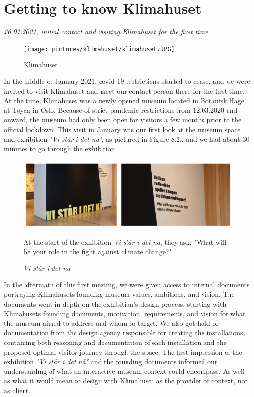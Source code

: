 \section{Getting to know Klimahuset}
\par
\emph{26.01.2021, initial contact and visiting Klimahuset for the first time}
\par

\begin{figure}[H]
\centering
\texttt{[image: pictures/klimahuset/klimahuset.JPG]}
\caption{Klimahuset}
\end{figure}

In the middle of January 2021, covid-19 restrictions started to cease, and we were invited to visit Klimahuset and meet our contact person there for the first time. At the time, Klimahuset was a newly opened museum located in Botanisk Hage at Tøyen in Oslo. Because of strict pandemic restrictions from 12.03.2020 and onward, the museum had only been open for visitors a few months prior to the official lockdown. This visit in January was our first look at the museum space and exhibition \emph{"Vi står i det nå"}, as pictured in Figure 8.2., and we had about 30 minutes to go through the exhibition.

\begin{figure}[H]
\centering
\includegraphics[width=12.5cm]{pictures/process/staar_i_det_naa.png}
\caption{\textit{Vi står i det nå}}{At the start of the exhibition \emph{Vi står i det nå}, they ask; "What will be your role in the fight against climate change?"}

\end{figure}

In the aftermath of this first meeting, we were given access to internal documents portraying Klimahusets founding museum values, ambitions, and vision. The documents went in-depth on the exhibition's design process, starting with Klimahusets founding documents, motivation, requirements, and vision for what the museum aimed to address and whom to target. We also got hold of documentation from the design agency responsible for creating the installations, containing both reasoning and documentation of each installation and the proposed optimal visitor journey through the space. The first impression of the exhibition \emph{"Vi står i det nå"} and the founding documents informed our understanding of what an interactive museum context could encompass. As well as what it would mean to design with Klimahuset as the provider of context, not as client.

